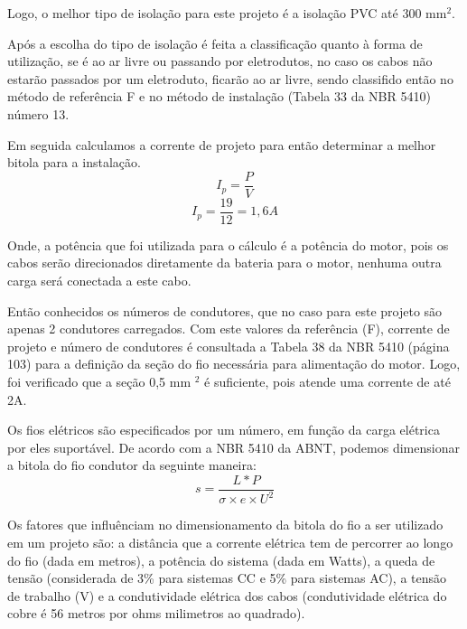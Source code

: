 \par Logo, o melhor tipo de isolação para este projeto é a isolação PVC até 300 mm$^2$.
\par Após a escolha do tipo de isolação é feita a classificação quanto à forma de utilização, se é ao ar livre ou passando por eletrodutos, no caso os cabos não estarão passados por um eletroduto, ficarão ao ar livre, sendo classifido então no método de referência F e no método de instalação (Tabela 33 da NBR 5410) número 13.
\par Em seguida calculamos a corrente de projeto para então determinar a melhor bitola para a instalação.
\begin{equation}
I_p= \frac{P}{V}
\end{equation}
\begin{equation}
I_p= \frac{19}{12}=1,6 A
\end{equation}

\par Onde, a potência que foi utilizada para o cálculo é a potência do motor, pois os cabos serão direcionados diretamente da bateria para o motor, nenhuma outra carga será conectada a este cabo.
\par Então conhecidos os números de condutores, que no caso para este projeto são apenas 2 condutores carregados. Com este valores da referência (F), corrente de projeto e número de condutores é consultada a Tabela 38 da NBR 5410 (página 103) para a definição da seção do fio necessária para alimentação do motor. Logo, foi verificado que a seção 0,5 mm $^2$ é suficiente, pois atende uma corrente de até 2A.

\par Os fios elétricos são especificados por um número, em função da carga elétrica por eles suportável. De acordo com a NBR 5410 da ABNT, podemos dimensionar a bitola do fio condutor da seguinte maneira:
\begin{equation}
s= \frac{L*P}{\sigma \times e\times {U}^{2}}
\end{equation}

\par Os fatores que influênciam no dimensionamento da bitola do fio a ser utilizado em um projeto são: a distância que a corrente elétrica tem de percorrer ao longo do fio (dada em metros), a potência do sistema (dada em Watts), a queda de tensão (considerada de 3\% para sistemas CC e 5\% para sistemas AC), a tensão de trabalho (V) e a condutividade elétrica dos cabos (condutividade elétrica do cobre é 56 metros por ohms milimetros ao quadrado).

